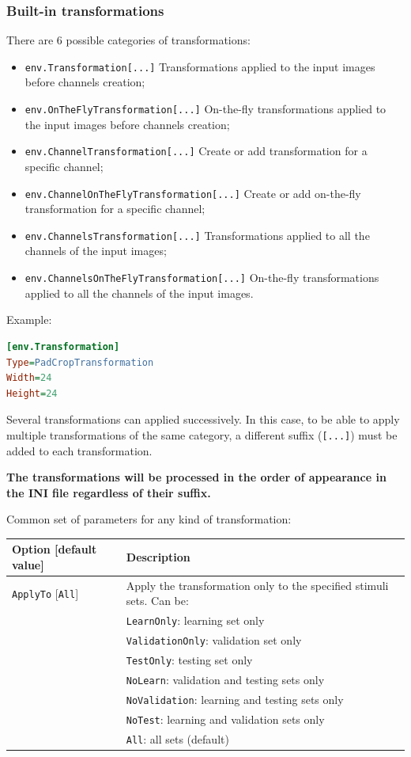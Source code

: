 \documentclass[a4paper,11pt,oneside]{article}
\newenvironment{myitemize}
{ \begin{itemize}
    \setlength{\itemsep}{0pt}
    \setlength{\parskip}{0pt}
    \setlength{\parsep}{0pt}     }
{ \end{itemize}                  }
\begin{document}
\subsubsection{\label{sec:transformations}Built-in transformations}

There are 6 possible categories of transformations:
\begin{myitemize}
\item \lstinline!env.Transformation[...]! Transformations applied to the
input images before channels creation;
\item \lstinline!env.OnTheFlyTransformation[...]! On-the-fly transformations
applied to the input images before channels creation;
\item \lstinline!env.ChannelTransformation[...]! Create or add transformation
for a specific channel;
\item \lstinline!env.ChannelOnTheFlyTransformation[...]! Create or add
on-the-fly transformation for a specific channel;
\item \lstinline!env.ChannelsTransformation[...]! Transformations applied to
all the channels of the input images;
\item \lstinline!env.ChannelsOnTheFlyTransformation[...]! On-the-fly
transformations applied to all the channels of the input images.
\end{myitemize}

Example:
\begin{lstlisting}[language=ini]
[env.Transformation]
Type=PadCropTransformation
Width=24
Height=24
\end{lstlisting}

Several transformations can applied successively. In this case, to be able
to apply multiple transformations of the same category, a different suffix
 (\lstinline![...]!) must be added to each transformation.

\textbf{The transformations will be processed in the order of appearance in the
 INI file regardless of their suffix.}

Common set of parameters for any kind of transformation:
\begin{center}
 \begin{longtable}{| p{5cm} | p{10cm} | }
 \hline
 Option [default value] & Description\\
 \hline\hline
  \lstinline!ApplyTo! [\lstinline!All!] & Apply the transformation only to the
  specified stimuli sets. Can be: \\
    & \lstinline!LearnOnly!: learning set only \\
    & \lstinline!ValidationOnly!: validation set only \\
    & \lstinline!TestOnly!: testing set only \\
    & \lstinline!NoLearn!: validation and testing sets only \\
    & \lstinline!NoValidation!: learning and testing sets only \\
    & \lstinline!NoTest!: learning and validation sets only \\
    & \lstinline!All!: all sets (default) \\
 \hline
\end{longtable}
\end{center}
\end{document}
